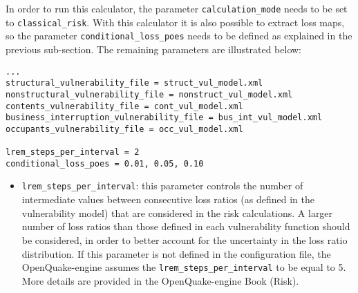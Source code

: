 In order to run this calculator, the parameter \Verb+calculation_mode+ needs to be set to \Verb+classical_risk+. With this calculator it is also possible to extract loss maps, so the parameter \Verb+conditional_loss_poes+ needs to be defined as explained in the previous sub-section. The remaining parameters are illustrated below:
\begin{Verbatim}[frame=single, commandchars=\\\{\}, samepage=true]
...
structural_vulnerability_file = struct_vul_model.xml
nonstructural_vulnerability_file = nonstruct_vul_model.xml
contents_vulnerability_file = cont_vul_model.xml
business_interruption_vulnerability_file = bus_int_vul_model.xml
occupants_vulnerability_file = occ_vul_model.xml

lrem_steps_per_interval = 2
conditional_loss_poes = 0.01, 0.05, 0.10
\end{Verbatim}

\begin{itemize}
\item  \Verb+lrem_steps_per_interval+: this parameter controls the number of intermediate values between consecutive loss ratios (as defined in the \gls{vulnerability model}) that are considered in the risk calculations. A larger number of loss ratios than those defined in each \gls{vulnerability function} should be considered, in order to better account for the uncertainty in the loss ratio distribution. If this parameter is not defined in the configuration file, the OpenQuake-engine assumes the \Verb+lrem_steps_per_interval+ to be equal to 5. More details are provided in the OpenQuake-engine Book (Risk).
\end{itemize}